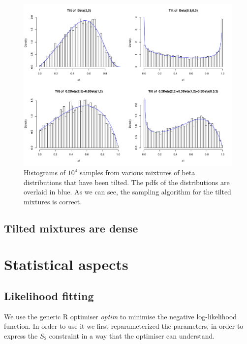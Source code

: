 \documentclass[10pt]{report}
\begin{document}
\begin{figure}[h]
\centering
\includegraphics[width=\textwidth]{histogram_tilt.pdf}
\caption{Histograms of $10^4$ samples from various mixtures of beta distributions that have been tilted. The pdfs of the distributions are overlaid in blue. As we can see, the sampling algorithm for the tilted mixtures is correct.}
\label{fig:historam_tilt}
\end{figure}




\section{Tilted mixtures are dense}

\chapter{Statistical aspects}
\label{sec:stats}
\section{Likelihood fitting}

We use the generic R optimiser \textit{optim} to minimise the negative log-likelihood function. In order to use it we first reparameterized the parameters, in order to express the $S_2$ constraint in a way that the optimiser can understand.
\end{document}
